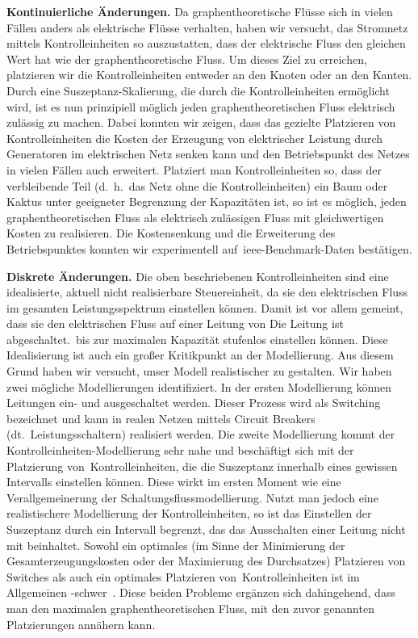 \textbf{Kontinuierliche {\"A}nderungen.} Da graphentheoretische Fl{\"u}sse sich
in vielen F{\"a}llen anders als elektrische Fl{\"u}sse verhalten, haben wir
versucht, das Stromnetz mittels Kontrolleinheiten so auszustatten, dass der
elektrische Fluss den gleichen Wert hat wie der graphentheoretische Fluss. Um
dieses Ziel zu erreichen, platzieren wir die Kontrolleinheiten entweder an den
Knoten oder an den Kanten. Durch eine Suszeptanz-Skalierung, die durch die
Kontrolleinheiten erm{\"o}glicht wird, ist es nun prinzipiell m{\"o}glich jeden
graphentheoretischen Fluss elektrisch zul{\"a}ssig zu machen. Dabei konnten wir
zeigen, dass das gezielte Platzieren von Kontrolleinheiten die Kosten der
Erzeugung von elektrischer Leistung durch Generatoren im elektrischen Netz
senken kann und den Betriebspunkt des Netzes in vielen F{\"a}llen auch
erweitert. Platziert man Kontrolleinheiten so, dass der verbleibende Teil (d.\
h.\ das Netz ohne die Kontrolleinheiten) ein Baum oder Kaktus unter geeigneter
Begrenzung der Kapazit{\"a}ten ist, so ist es m{\"o}glich, jeden
graphentheoretischen Fluss als elektrisch zul{\"a}ssigen Fluss mit
gleichwertigen Kosten zu realisieren. Die Kostensenkung und die Erweiterung des
Betriebspunktes konnten wir experimentell auf~\gls{ieee}-Benchmark-Daten
best{\"a}tigen.

\textbf{Diskrete {\"A}nderungen.} Die oben beschriebenen Kontrolleinheiten sind
eine idealisierte, aktuell nicht realisierbare Steuereinheit, da sie den
elektrischen Fluss im gesamten Leistungsspektrum einstellen können. Damit ist
vor allem gemeint, dass sie den elektrischen Fluss auf einer Leitung von \glqq
Die Leitung ist abgeschaltet.\grqq\ bis zur maximalen Kapazit{\"a}t stufenlos
einstellen k{\"o}nnen. Diese Idealisierung ist auch ein
% 
gro{\ss}er Kritikpunkt an der Modellierung. Aus diesem Grund haben wir versucht,
unser Modell realistischer zu gestalten. Wir haben zwei m{\"o}gliche
Modellierungen identifiziert. In der ersten Modellierung können Leitungen ein-
und ausgeschaltet werden. Dieser Prozess wird als Switching bezeichnet und kann
in realen Netzen mittels Circuit Breakers (dt.\ Leistungsschaltern) realisiert
werden. Die zweite Modellierung kommt der Kontrolleinheiten-Modellierung sehr
nahe und beschäftigt sich mit der Platzierung von~Kontrolleinheiten, die die
Suszeptanz innerhalb eines gewissen Intervalls einstellen k{\"o}nnen. Diese
wirkt im ersten Moment wie eine Verallgemeinerung der
Schaltungsflussmodellierung. Nutzt man jedoch eine realistischere Modellierung
der Kontrolleinheiten, so ist das Einstellen der Suszeptanz durch ein Intervall
begrenzt, das das Ausschalten einer Leitung nicht mit beinhaltet. Sowohl ein
optimales (im Sinne der Minimierung der Gesamterzeugungskosten oder der
Maximierung des Durchsatzes) Platzieren von Switches als auch ein optimales
Platzieren von~Kontrolleinheiten ist im Allgemeinen
\NP-schwer~\parencite{Leh14}. Diese beiden Probleme erg{\"a}nzen sich
dahingehend, dass man den maximalen graphentheoretischen Fluss, mit den zuvor
genannten Platzierungen ann{\"a}hern kann.

